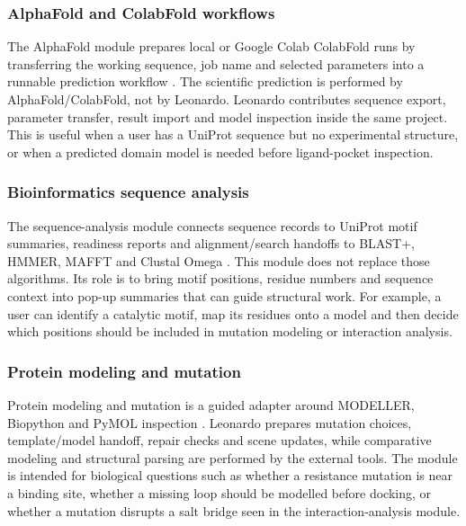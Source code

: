 \documentclass[pdflatex,sn-vancouver-num]{sn-jnl}
\begin{document}
\subsubsection{AlphaFold and ColabFold workflows}

The AlphaFold module prepares local or Google Colab ColabFold runs by transferring the working sequence, job name and selected parameters into a runnable prediction workflow \cite{alphafold2021,colabfold2022}.  The scientific prediction is performed by AlphaFold/ColabFold, not by Leonardo.  Leonardo contributes sequence export, parameter transfer, result import and model inspection inside the same project.  This is useful when a user has a UniProt sequence but no experimental structure, or when a predicted domain model is needed before ligand-pocket inspection.

\subsubsection{Bioinformatics sequence analysis}

The sequence-analysis module connects sequence records to UniProt motif summaries, readiness reports and alignment/search handoffs to BLAST+, HMMER, MAFFT and Clustal Omega \cite{uniprot2025,blastplus2009,hmmer2011,mafft2013,clustalo2011}.  This module does not replace those algorithms.  Its role is to bring motif positions, residue numbers and sequence context into pop-up summaries that can guide structural work.  For example, a user can identify a catalytic motif, map its residues onto a model and then decide which positions should be included in mutation modeling or interaction analysis.

\subsubsection{Protein modeling and mutation}

Protein modeling and mutation is a guided adapter around MODELLER, Biopython and PyMOL inspection \cite{modeller1993,biopython2009,pymol}.  Leonardo prepares mutation choices, template/model handoff, repair checks and scene updates, while comparative modeling and structural parsing are performed by the external tools.  The module is intended for biological questions such as whether a resistance mutation is near a binding site, whether a missing loop should be modelled before docking, or whether a mutation disrupts a salt bridge seen in the interaction-analysis module.
\end{document}
